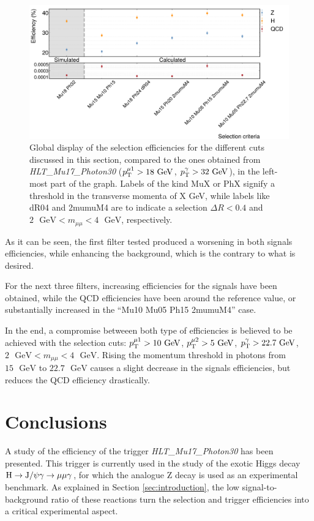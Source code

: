\documentclass[11pt, a4paper]{article}
\newcommand{\GeV}{\textrm{ }\mathrm{GeV}}
\renewcommand{\H}{{\rm H}}
\newcommand{\JPsi}{{\rm J}/\psi}
\newcommand{\pt}{p_{\rm T}}
\begin{document}
\begin{figure}[htbp]
    \centering
    \includegraphics[width=1\linewidth]{images/eff_comparison.pdf}
    \caption{Global display of the selection efficiencies for the different cuts discussed in this section, compared to the ones obtained from {\it HLT\_Mu17\_Photon30} ($\pt^{\mu 1} > 18\GeV$, $\pt^{\gamma} > 32\GeV$), in the left-most part of the graph. Labels of the kind MuX or PhX signify a threshold in the transverse momenta of X GeV, while labels like dR04 and 2mumuM4 are to indicate a selection $\Delta R < 0.4$ and $2\GeV < m_{\mu\mu} < 4\GeV$, respectively.
    \label{im:eff_comparison}}
\end{figure}

As it can be seen, the first filter tested produced a worsening in both signals efficiencies, while enhancing the background, which is the contrary to what is desired.

For the next three filters, increasing efficiencies for the signals have been obtained, while the QCD efficiencies have been around the reference value, or substantially increased in the ``Mu10 Mu05 Ph15 2mumuM4'' case.

In the end, a compromise betweeen both type of efficiencies is believed to be achieved with the selection cuts: $\pt^{\mu 1} > 10\GeV$, $\pt^{\mu 2} > 5\GeV$, $\pt^{\gamma} > 22.7\GeV$, $2\GeV < m_{\mu\mu} < 4\GeV$. Rising the momentum threshold in photons from $15\GeV$ to $22.7\GeV$ causes a slight decrease in the signals efficiencies, but reduces the QCD efficiency drastically.

\section{Conclusions}

A study of the efficiency of the trigger {\it HLT\_Mu17\_Photon30} has been presented. This trigger is currently used in the study of the exotic Higgs decay $\H \rightarrow \JPsi\gamma \rightarrow \mu\mu\gamma$, for which the analogue Z decay is used as an experimental benchmark. As explained in Section \ref{sec:introduction}, the low signal-to-background ratio of these reactions turn the selection and trigger efficiencies into a critical experimental aspect.
\end{document}
